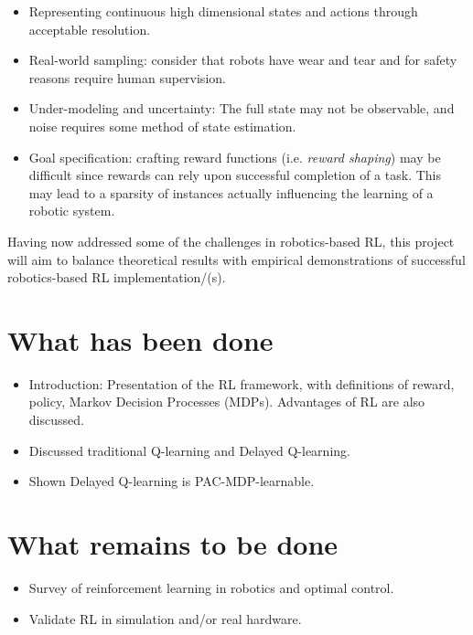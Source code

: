 \documentclass[10pt]{article}
\begin{document}
\begin{itemize}
\item Representing continuous high dimensional states and actions through acceptable resolution.
\item Real-world sampling: consider that robots have wear and tear and for safety reasons require human supervision.
\item Under-modeling and uncertainty: The full state may not be observable, and noise requires some method of state estimation.
\item Goal specification: crafting reward functions (i.e. \textit{reward shaping}) may be difficult since rewards can rely upon successful completion of a task. This may lead to a sparsity of instances actually influencing the learning of a robotic system.
\end{itemize}
Having now addressed some of the challenges in robotics-based RL, this project will aim to balance theoretical results with empirical demonstrations of successful robotics-based RL implementation/(s). 



\section{What has been done}
\begin{itemize}
\item Introduction: Presentation of the RL framework, with definitions of reward, policy, Markov Decision Processes (MDPs). Advantages of RL are also discussed.
\item Discussed traditional Q-learning and Delayed Q-learning.
\item Shown Delayed Q-learning is PAC-MDP-learnable.
\end{itemize}


\section{What remains to be done}
\begin{itemize}
\item Survey of reinforcement learning in robotics and optimal control. 
\item Validate RL in simulation and/or real hardware.
\end{itemize}

\nocite{yang_multiagent_2004}
\nocite{kim_autonomous_2003}
\nocite{mohri_foundations_2012}


\newpage
{}





\end{document}
